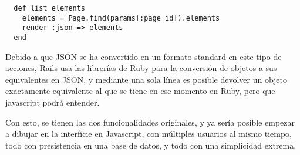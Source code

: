 \begin{verbatim}
  def list_elements
    elements = Page.find(params[:page_id]).elements
    render :json => elements
  end
\end{verbatim}

Debido a que JSON se ha convertido en un formato standard en este tipo de acciones, Rails usa las librerías de Ruby para la conversión de objetos a sus equivalentes en JSON, y mediante una sola línea es posible devolver un objeto exactamente equivalente al que se tiene en ese momento en Ruby, pero que javascript podrá entender.

Con esto, se tienen las dos funcionalidades originales, y ya sería posible empezar a dibujar en la interfície en Javascript, con múltiples usuarios al mismo tiempo, todo con presistencia en una base de datos, y todo con una simplicidad extrema.


